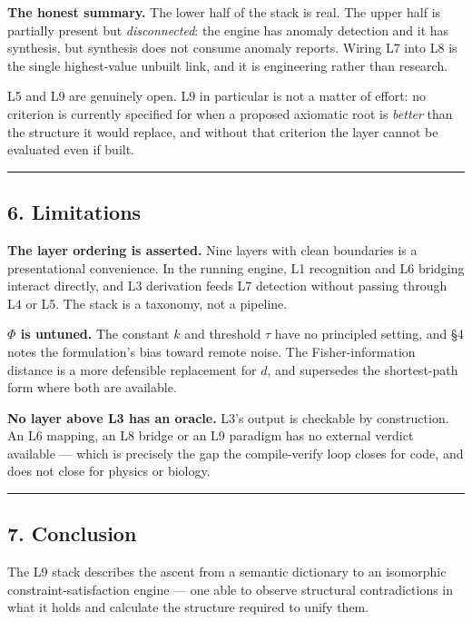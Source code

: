 \documentclass[
  11pt,
  a4paper,
]{article}
\begin{document}
\textbf{The honest summary.} The lower half of the stack is real. The
upper half is partially present but \emph{disconnected}: the engine has
anomaly detection and it has synthesis, but synthesis does not consume
anomaly reports. Wiring L7 into L8 is the single highest-value unbuilt
link, and it is engineering rather than research.

L5 and L9 are genuinely open. L9 in particular is not a matter of
effort: no criterion is currently specified for when a proposed
axiomatic root is \emph{better} than the structure it would replace, and
without that criterion the layer cannot be evaluated even if built.

\begin{center}\rule{0.5\linewidth}{0.5pt}\end{center}

\subsection{6. Limitations}\label{limitations}

\textbf{The layer ordering is asserted.} Nine layers with clean
boundaries is a presentational convenience. In the running engine, L1
recognition and L6 bridging interact directly, and L3 derivation feeds
L7 detection without passing through L4 or L5. The stack is a taxonomy,
not a pipeline.

\textbf{\(\Phi\) is untuned.} The constant \(k\) and threshold \(\tau\)
have no principled setting, and §4 notes the formulation's bias toward
remote noise. The Fisher-information distance is a more defensible
replacement for \(d\), and supersedes the shortest-path form where both
are available.

\textbf{No layer above L3 has an oracle.} L3's output is checkable by
construction. An L6 mapping, an L8 bridge or an L9 paradigm has no
external verdict available --- which is precisely the gap the
compile-verify loop closes for code, and does not close for physics or
biology.

\begin{center}\rule{0.5\linewidth}{0.5pt}\end{center}

\subsection{7. Conclusion}\label{conclusion}

The L9 stack describes the ascent from a semantic dictionary to an
isomorphic constraint-satisfaction engine --- one able to observe
structural contradictions in what it holds and calculate the structure
required to unify them.
\end{document}
